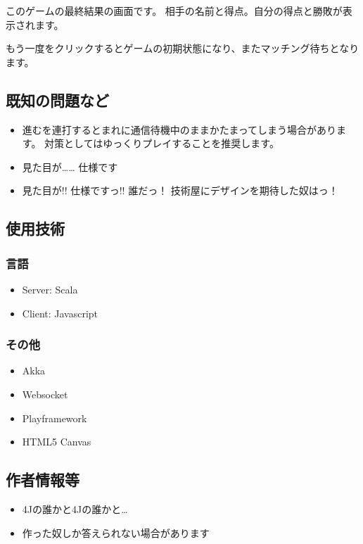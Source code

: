 このゲームの最終結果の画面です。
相手の名前と得点。自分の得点と勝敗が表示されます。

もう一度をクリックするとゲームの初期状態になり、またマッチング待ちとなります。

\subsection{既知の問題など}\label{ux65e2ux77e5ux306eux554fux984cux306aux3069}

\begin{itemize}[<+->]
\itemsep1pt\parskip0pt
\item
  進むを連打するとまれに通信待機中のままかたまってしまう場合があります。
  対策としてはゆっくりプレイすることを推奨します。
\item
  見た目が\ldots{}\ldots{} 仕様です
\item
  見た目が!! 仕様ですっ!! 誰だっ！ 技術屋にデザインを期待した奴はっ！
\end{itemize}

\subsection{使用技術}\label{ux4f7fux7528ux6280ux8853}

\subsubsection{言語}\label{ux8a00ux8a9e}

\begin{itemize}[<+->]
\itemsep1pt\parskip0pt
\item
  Server: Scala
\item
  Client: Javascript
\end{itemize}

\subsubsection{その他}\label{ux305dux306eux4ed6}

\begin{itemize}[<+->]
\itemsep1pt\parskip0pt
\item
  Akka
\item
  Websocket
\item
  Playframework
\item
  HTML5 Canvas
\end{itemize}

\subsection{作者情報等}\label{ux4f5cux8005ux60c5ux5831ux7b49}

\begin{itemize}[<+->]
\itemsep1pt\parskip0pt
\item
  4Jの誰かと4Jの誰かと\ldots{}
\item
  作った奴しか答えられない場合があります
\end{itemize}
